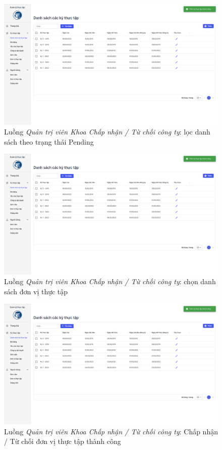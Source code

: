 \documentclass[./../main.tex]{subfiles}
\begin{document}
\begin{figure}[]
	\includegraphics[width=\linewidth]{./images/image55.png} %
	\caption{Luồng \emph{Quản trị viên Khoa Chấp nhận / Từ chối công ty}: lọc danh sách theo trạng thái Pending}
	\label{fig:org_admin_filter_partners}
\end{figure}

\begin{figure}[]
	\includegraphics[width=\linewidth]{./images/image55.png} %
	\caption{Luồng \emph{Quản trị viên Khoa Chấp nhận / Từ chối công ty}: chọn danh sách đơn vị thực tập}
	\label{fig:org_admin_select_partners}
\end{figure}

\begin{figure}[]
	\includegraphics[width=\linewidth]{./images/image55.png} %
	\caption{Luồng \emph{Quản trị viên Khoa Chấp nhận / Từ chối công ty}: Chấp nhận / Từ chối đơn vị thực tập thành công}
	\label{fig:org_admin_approve_reject_partner_success}
\end{figure}
\end{document}
